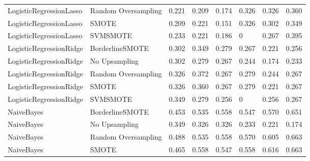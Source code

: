 \begin{tabular}{llllllll}
     LogisticRegressionLasso & Random Oversampling & 0.221 &                     0.209 &                 0.174 &                  0.326 &                                   0.326 &     0.360 \\
     LogisticRegressionLasso &               SMOTE & 0.209 &                     0.221 &                 0.151 &                  0.326 &                                   0.302 &     0.349 \\
     LogisticRegressionLasso &            SVMSMOTE & 0.233 &                     0.221 &                 0.186 &                      0 &                                   0.267 &     0.395 \\
     LogisticRegressionRidge &     BorderlineSMOTE & 0.302 &                     0.349 &                 0.279 &                  0.267 &                                   0.221 &     0.256 \\
     LogisticRegressionRidge &       No Upsampling & 0.302 &                     0.279 &                 0.267 &                  0.244 &                                   0.174 &     0.233 \\
     LogisticRegressionRidge & Random Oversampling & 0.326 &                     0.372 &                 0.267 &                  0.279 &                                   0.244 &     0.267 \\
     LogisticRegressionRidge &               SMOTE & 0.326 &                     0.360 &                 0.267 &                  0.279 &                                   0.221 &     0.267 \\
     LogisticRegressionRidge &            SVMSMOTE & 0.349 &                     0.279 &                 0.256 &                      0 &                                   0.256 &     0.267 \\
                  NaiveBayes &     BorderlineSMOTE & 0.453 &                     0.535 &                 0.558 &                  0.547 &                                   0.570 &     0.651 \\
                  NaiveBayes &       No Upsampling & 0.349 &                     0.326 &                 0.326 &                  0.233 &                                   0.221 &     0.174 \\
                  NaiveBayes & Random Oversampling & 0.488 &                     0.535 &                 0.558 &                  0.570 &                                   0.605 &     0.663 \\
                  NaiveBayes &               SMOTE & 0.465 &                     0.558 &                 0.547 &                  0.558 &                                   0.616 &     0.663 \\

\end{tabular}
